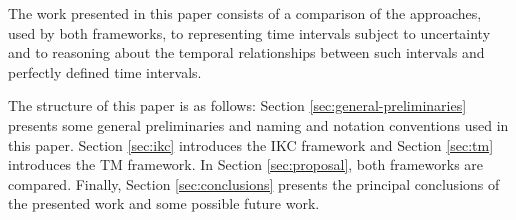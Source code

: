 The work presented in this paper consists of a comparison of the approaches, used by both frameworks, to representing time intervals subject to uncertainty and to reasoning about the temporal relationships between such intervals and perfectly defined time intervals. 

The structure of this paper is as follows: Section \ref{sec:general-preliminaries} presents some general preliminaries and naming and notation conventions used in this paper. Section \ref{sec:ikc} introduces the IKC framework and Section \ref{sec:tm} introduces the TM framework. In Section \ref{sec:proposal}, both frameworks are compared. Finally, Section \ref{sec:conclusions} presents the principal conclusions of the presented work and some possible future work. 




